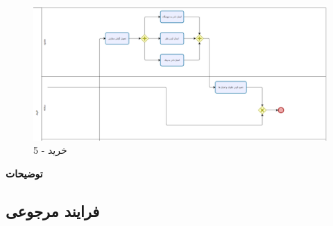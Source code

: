\documentclass[12pt,a4paper]{article}
\begin{document}
	\begin{figure}[h!]
		\begin{center}
			\includegraphics[width=14cm]{images/Bizagi Buy 5.png}	
		\end{center}
		\caption{خرید - 5}
	\end{figure}
	
	\textbf{توضیحات}
	
	
	\pagebreak
\subsection{فرایند مرجوعی} \label{section.function.return}
\end{document}
